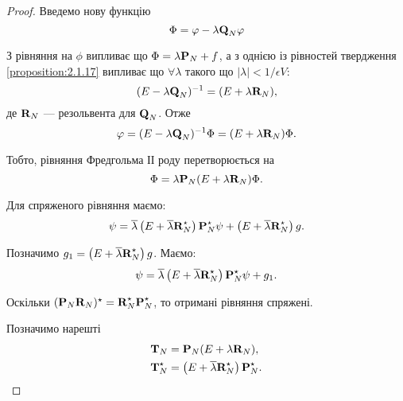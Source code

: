 \begin{proof}
	Введемо нову функцію 
	\begin{equation}
		\Phi = \phi - \lambda \bf{Q}_N \phi
	\end{equation}

	З рівняння на $\phi$ випливає що $\Phi = \lambda \bf{P}_N + f$, а з однією із рівностей твердження \ref{proposition:2.1.17} випливає що $\forall \lambda$ такого що $|\lambda| < 1 / \epsilon V$:
	\begin{equation}
		(E - \lambda \bf{Q}_N)^{-1} = (E + \lambda \bf{R}_N),
	\end{equation}
	де $\bf{R}_N$ --- резольвента для $\bf{Q}_N$. Отже
	\begin{equation}
		\phi = (E - \lambda \bf{Q}_N)^{-1} \Phi = (E + \lambda \bf{R}_N) \Phi.
	\end{equation}

	Тобто, рівняння Фредгольма ІІ роду перетворюється на 
	\begin{equation}
		\Phi = \lambda \bf{P}_N (E + \lambda \bf{R}_N) \Phi.
	\end{equation}

	Для спряженого рівняння маємо:
	\begin{equation}
		\psi = \overline \lambda \left(E + \overline \lambda \bf{R}_N^\star\right) \bf{P}_N^\star  \psi + \left(E + \overline \lambda \bf{R}_N^\star\right) g.
	\end{equation}

	Позначимо $g_1 = \left(E + \overline \lambda \bf{R}_N^\star\right) g$. Маємо:
	\begin{equation}
		\psi = \overline \lambda \left(E + \overline \lambda \bf{R}_N^\star\right) \bf{P}_N^\star  \psi + g_1.
	\end{equation}

	Оскільки $(\bf{P}_N \bf{R}_N)^\star  = \bf{R}_N^\star  \bf{P}_N^\star $, то отримані рівняння спряжені. \medskip

	Позначимо нарешті
	\begin{align}
		\bf{T}_N &= \bf{P}_N (E + \lambda \bf{R}_N), \\
		\bf{T}_N^\star &= \left(E + \overline \lambda \bf{R}_N^\star\right) \bf{P}_N^\star.
	\end{align}


\end{proof}

